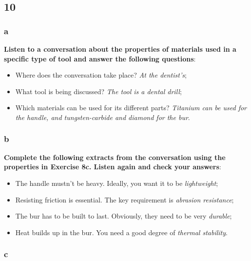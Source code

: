 \subsection{10}

\subsubsection{a}

\textbf{Listen to a conversation about the properties of materials used in a specific type of tool and answer the following questions}:

\begin{itemize}

\item Where does the conversation take place? \textit{At the dentist's};
\item What tool is being discussed? \textit{The tool is a dental drill};
\item Which materials can be used for its different parts? \textit{Titanium can be used for the handle, and tungsten-carbide and diamond for the bur}.

\end{itemize}

\subsubsection{b}

\textbf{Complete the following extracts from the conversation using the properties in Exercise 8c. Listen again and check your answers}:

\begin{itemize}

\item The handle mustn't be heavy. Ideally, you want it to be \textit{lightweight};
\item Resisting friction is essential. The key requirement is \textit{abrasion resistance};
\item The bur has to be built to last. Obviously, they need to be very \textit{durable};
\item Heat builds up in the bur. You need a good degree of \textit{thermal stability}.

\end{itemize}

\subsubsection{c}

